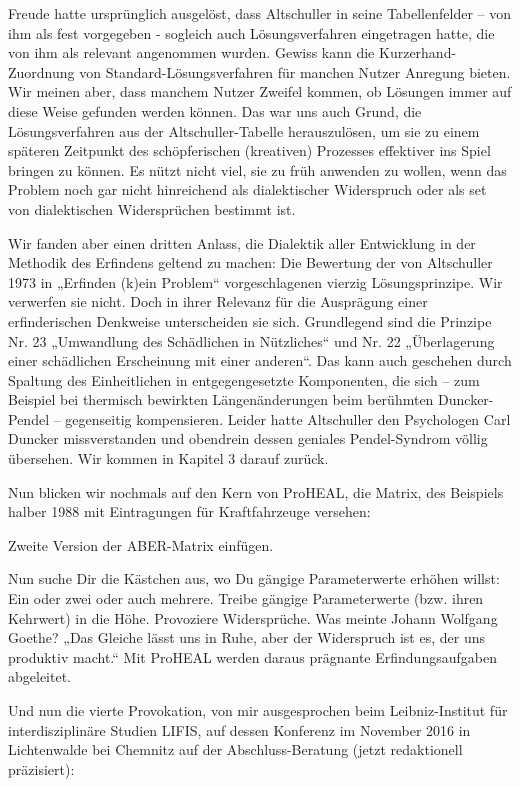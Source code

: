\documentclass[12pt,a4paper]{article}
\begin{document}
Freude hatte ursprünglich ausgelöst, dass Altschuller in seine Tabellenfelder –
von ihm als fest vorgegeben - sogleich auch Lösungsverfahren eingetragen hatte,
die von ihm als relevant angenommen wurden. Gewiss kann die
Kurzerhand-Zuordnung von Standard-Lösungsverfahren für manchen Nutzer Anregung
bieten. Wir meinen aber, dass manchem Nutzer Zweifel kommen, ob Lösungen immer
auf diese Weise gefunden werden können. Das war uns auch Grund, die
Lösungsverfahren aus der Altschuller-Tabelle herauszulösen, um sie zu einem
späteren Zeitpunkt des schöpferischen (kreativen) Prozesses effektiver ins
Spiel bringen zu können. Es nützt nicht viel, sie zu früh anwenden zu wollen,
wenn das Problem noch gar nicht hinreichend als dialektischer Widerspruch oder
als set von dialektischen Widersprüchen bestimmt ist.

Wir fanden aber einen dritten Anlass, die Dialektik aller Entwicklung in der
Methodik des Erfindens geltend zu machen: Die Bewertung der von Altschuller
1973 in „Erfinden (k)ein Problem“ vorgeschlagenen vierzig Lösungsprinzipe. Wir
verwerfen sie nicht. Doch in ihrer Relevanz für die Ausprägung einer
erfinderischen Denkweise unterscheiden sie sich. Grundlegend sind die Prinzipe
Nr. 23 „Umwandlung des Schädlichen in Nützliches“ und Nr. 22 „Überlagerung
einer schädlichen Erscheinung mit einer anderen“. Das kann auch geschehen durch
Spaltung des Einheitlichen in entgegengesetzte Komponenten, die sich – zum
Beispiel bei thermisch bewirkten Längenänderungen beim berühmten Duncker-Pendel
-- gegenseitig kompensieren. Leider hatte Altschuller den Psychologen Carl
Duncker missverstanden und obendrein dessen geniales Pendel-Syndrom völlig
übersehen. Wir kommen in Kapitel 3 darauf zurück.

Nun blicken wir nochmals auf den Kern von ProHEAL, die Matrix, des Beispiels
halber 1988 mit Eintragungen für Kraftfahrzeuge versehen:
\begin{center}
  Zweite Version der ABER-Matrix einfügen.
\end{center}
Nun suche Dir die Kästchen aus, wo Du gängige Parameterwerte erhöhen willst:
Ein oder zwei oder auch mehrere. Treibe gängige Parameterwerte (bzw. ihren
Kehrwert) in die Höhe. Provoziere Widersprüche. Was meinte Johann Wolfgang
Goethe? „Das Gleiche lässt uns in Ruhe, aber der Widerspruch ist es, der uns
produktiv macht.“ Mit ProHEAL werden daraus prägnante Erfindungsaufgaben
abgeleitet.

Und nun die vierte Provokation, von mir ausgesprochen beim Leibniz-Institut für
interdisziplinäre Studien LIFIS, auf dessen Konferenz im November 2016 in
Lichtenwalde bei Chemnitz auf der Abschluss-Beratung (jetzt redaktionell
präzisiert):
\end{document}
